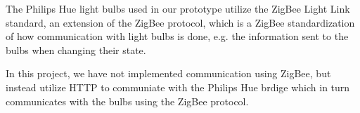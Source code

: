 The Philips Hue light bulbs used in our prototype utilize the ZigBee Light Link standard, an extension of the ZigBee protocol, which is a ZigBee standardization of how communication with light bulbs is done, e.g. the information sent to the bulbs when changing their state.

In this project, we have not implemented communication using ZigBee, but instead utilize HTTP to communiate with the Philips Hue brdige which in turn communicates with the bulbs using the ZigBee protocol.

